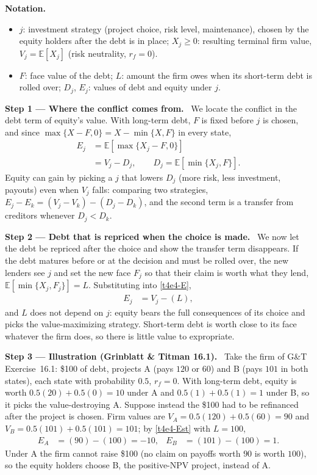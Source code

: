 \documentclass[11pt,a4paper]{article}
\newcommand{\notation}{\par\noindent\textbf{Notation.}}
\newcommand{\step}[2]{\par\medskip\noindent\textbf{Step #1 --- #2.}~}
\begin{document}
\notation
\begin{itemize}
  \item $j$: investment strategy (project choice, risk level, maintenance), chosen by the equity holders after the debt is in place; $X_j\ge 0$: resulting terminal firm value, $V_j=\mathbb{E}[X_j]$ (risk neutrality, $r_f=0$).
  \item $F$: face value of the debt; $L$: amount the firm owes when its short-term debt is rolled over; $D_j$, $E_j$: values of debt and equity under $j$.
\end{itemize}

\step{1}{Where the conflict comes from} We locate the conflict in the debt term of equity's value.
With long-term debt, $F$ is fixed before $j$ is chosen, and since $\max\{X-F,0\}=X-\min\{X,F\}$ in
every state,
\begin{align}
  E_j &= \mathbb{E}[\max\{X_j-F,0\}] \label{t4e4-E}\\
      &= V_j-D_j, \qquad D_j=\mathbb{E}[\min\{X_j,F\}]. \nonumber
\end{align}
Equity can gain by picking a $j$ that lowers $D_j$ (more risk, less investment, payouts) even
when $V_j$ falls: comparing two strategies, $E_j-E_k=(V_j-V_k)-(D_j-D_k)$, and the second term
is a transfer from creditors whenever $D_j<D_k$.

\step{2}{Debt that is repriced when the choice is made} We now let the debt be repriced after the
choice and show the transfer term disappears. If the debt matures before or at the
decision and must be rolled over, the new lenders see $j$ and set the new face $F_j$ so that
their claim is worth what they lend, $\mathbb{E}[\min\{X_j,F_j\}]=L$. Substituting into
\eqref{t4e4-E},
\begin{align}
  E_j &= V_j-(L), \label{t4e4-Est}
\end{align}
and $L$ does not depend on $j$: equity bears the full consequences of its choice and picks
the value-maximizing strategy. Short-term debt is worth close to its face whatever the firm
does, so there is little value to expropriate.

\step{3}{Illustration (Grinblatt \& Titman 16.1)} Take the firm of G\&T Exercise~16.1: \$100 of
debt, projects A (pays $120$ or $60$) and B (pays $101$ in both states), each state with
probability $0.5$, $r_f=0$. With long-term debt, equity is worth $0.5(20)+0.5(0)=10$ under A and
$0.5(1)+0.5(1)=1$ under B, so it picks the value-destroying A. Suppose instead the \$100 had to be
refinanced after the project is chosen. Firm values are
$V_A=0.5(120)+0.5(60)=90$ and $V_B=0.5(101)+0.5(101)=101$; by \eqref{t4e4-Est} with $L=100$,
\begin{align}
  E_A &= (90)-(100) = -10, & E_B &= (101)-(100) = 1. \nonumber
\end{align}
Under A the firm cannot raise \$100 (no claim on payoffs worth $90$ is worth $100$), so the
equity holders choose B, the positive-NPV project, instead of A.
\end{document}
